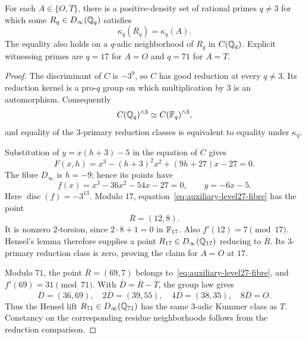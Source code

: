 \begin{lemma}
\label{lem:auxiliary-level27-kummer-failure}
For each \(A\in\{O,T\}\), there is a positive-density set of rational
primes \(q\ne3\) for which some \(R_q\in D_\infty(\mathbb Q_q)\) satisfies
\[
 \kappa_q(R_q)=\kappa_q(A).
\]
The equality also holds on a \(q\)-adic neighborhood of \(R_q\) in
\(C(\mathbb Q_q)\). Explicit witnessing primes are \(q=17\) for \(A=O\)
and \(q=71\) for \(A=T\).
\end{lemma}

\begin{proof}
The discriminant of \(C\) is \(-3^9\), so \(C\) has good reduction at
every \(q\ne3\). Its reduction kernel is a pro-\(q\) group on which
multiplication by \(3\) is an automorphism. Consequently
\[
 C(\mathbb Q_q)^{\wedge3}\simeq C(\mathbb F_q)^{\wedge3},
\]
and equality of the \(3\)-primary reduction classes is equivalent to
equality under \(\kappa_q\).

Substitution of \(y=x(h+3)-5\) in the equation of \(C\) gives
\[
 F(x,h)=x^3-(h+3)^2x^2+(9h+27)x-27=0.
\]
The fibre \(D_\infty\) is \(h=-9\); hence its points have
\begin{equation}\label{eq:auxiliary-level27-fibre}
 f(x)=x^3-36x^2-54x-27=0,\qquad y=-6x-5.
\end{equation}
Here \(\operatorname{disc}(f)=-3^{13}\).
Modulo \(17\), equation~\eqref{eq:auxiliary-level27-fibre} has the point
\[
 \overline R=(12,8).
\]
It is nonzero \(2\)-torsion, since \(2\cdot8+1=0\) in \(\mathbb F_{17}\).
Also \(f'(12)=7\pmod {17}\). Hensel's lemma therefore supplies a
point \(R_{17}\in D_\infty(\mathbb Q_{17})\) reducing to \(\overline R\).
Its \(3\)-primary reduction class is zero, proving the claim for
\(A=O\) at \(17\).

Modulo \(71\), the point \(\overline R=(69,7)\) belongs to~\eqref{eq:auxiliary-level27-fibre}, and
\(f'(69)=31\pmod {71}\). With \(\overline D=\overline R-\overline T\),
the group law gives
\[
 \overline D=(36,69),\quad
 2\overline D=(39,55),\quad
 4\overline D=(38,35),\quad
 8\overline D=O.
\]
Thus the Hensel lift \(R_{71}\in D_\infty(\mathbb Q_{71})\) has the same
\(3\)-adic Kummer class as \(T\). Constancy on the corresponding
residue neighborhoods follows from the reduction comparison.


\end{proof}

